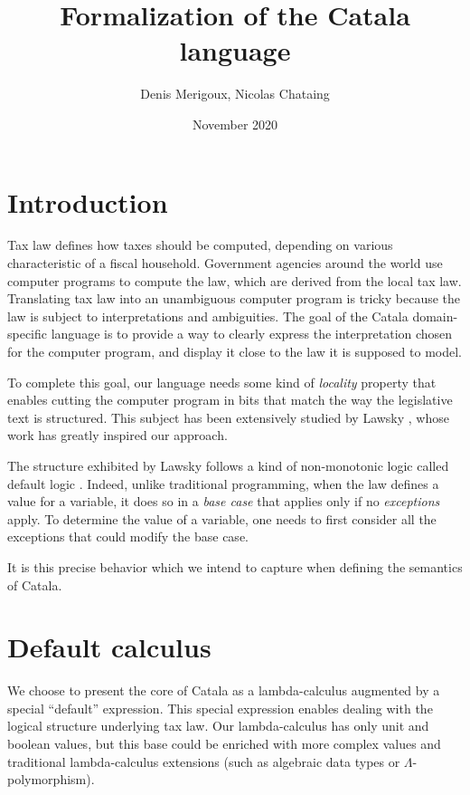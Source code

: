 \documentclass[11pt,a4paper]{article}
\title{Formalization of the Catala language}
\date{November 2020}
\author{Denis Merigoux, Nicolas Chataing}
\begin{document}
\maketitle

\tableofcontents

\section{Introduction}

Tax law defines how taxes should be computed, depending on various characteristic
of a fiscal household. Government agencies around the world use computer 
programs to compute the law, which are derived from the local tax law. Translating 
tax law into an unambiguous computer program is tricky because the law is subject to 
interpretations and ambiguities. The goal of the Catala domain-specific language 
is to provide a way to clearly express the interpretation chosen for the 
computer program, and display it close to the law it is supposed to model.

To complete this goal, our language needs some kind of \emph{locality} property
that enables cutting the computer program in bits that match the way the 
legislative text is structured. This subject has been extensively studied by
Lawsky \cite{lawsky2017, lawsky2018, lawsky2020form}, whose work has greatly 
inspired our approach.

The structure exhibited by Lawsky follows a kind of non-monotonic logic called 
default logic \cite{Reiter1987}. Indeed, unlike traditional programming, when the law defines 
a value for a variable, it does so in a \emph{base case} that applies only if 
no \emph{exceptions} apply. To determine the value of a variable, one needs to 
first consider all the exceptions that could modify the base case. 

It is this precise behavior which we intend to capture when defining the semantics 
of Catala.

\section{Default calculus}

We choose to present the core of Catala as a lambda-calculus augmented by a special 
\enquote{default} expression. This special expression enables dealing with 
the logical structure underlying tax law. Our lambda-calculus has only unit and 
boolean values, but this base could be enriched with more complex values and traditional 
lambda-calculus extensions (such as algebraic data types or $\Lambda$-polymorphism).
\end{document}
